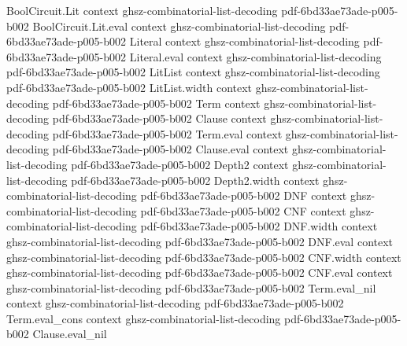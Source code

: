 \begin{lemma}
\label{BoolFourier.fourier_expansion}
\leanok
{}
\proofstep
  {BoolCircuit.Lit}
  {context}
  {ghsz-combinatorial-list-decoding}
  {pdf-6bd33ae73ade-p005-b002}
\proofstep
  {BoolCircuit.Lit.eval}
  {context}
  {ghsz-combinatorial-list-decoding}
  {pdf-6bd33ae73ade-p005-b002}
\proofstep
  {Literal}
  {context}
  {ghsz-combinatorial-list-decoding}
  {pdf-6bd33ae73ade-p005-b002}
\proofstep
  {Literal.eval}
  {context}
  {ghsz-combinatorial-list-decoding}
  {pdf-6bd33ae73ade-p005-b002}
\proofstep
  {LitList}
  {context}
  {ghsz-combinatorial-list-decoding}
  {pdf-6bd33ae73ade-p005-b002}
\proofstep
  {LitList.width}
  {context}
  {ghsz-combinatorial-list-decoding}
  {pdf-6bd33ae73ade-p005-b002}
\proofstep
  {Term}
  {context}
  {ghsz-combinatorial-list-decoding}
  {pdf-6bd33ae73ade-p005-b002}
\proofstep
  {Clause}
  {context}
  {ghsz-combinatorial-list-decoding}
  {pdf-6bd33ae73ade-p005-b002}
\proofstep
  {Term.eval}
  {context}
  {ghsz-combinatorial-list-decoding}
  {pdf-6bd33ae73ade-p005-b002}
\proofstep
  {Clause.eval}
  {context}
  {ghsz-combinatorial-list-decoding}
  {pdf-6bd33ae73ade-p005-b002}
\proofstep
  {Depth2}
  {context}
  {ghsz-combinatorial-list-decoding}
  {pdf-6bd33ae73ade-p005-b002}
\proofstep
  {Depth2.width}
  {context}
  {ghsz-combinatorial-list-decoding}
  {pdf-6bd33ae73ade-p005-b002}
\proofstep
  {DNF}
  {context}
  {ghsz-combinatorial-list-decoding}
  {pdf-6bd33ae73ade-p005-b002}
\proofstep
  {CNF}
  {context}
  {ghsz-combinatorial-list-decoding}
  {pdf-6bd33ae73ade-p005-b002}
\proofstep
  {DNF.width}
  {context}
  {ghsz-combinatorial-list-decoding}
  {pdf-6bd33ae73ade-p005-b002}
\proofstep
  {DNF.eval}
  {context}
  {ghsz-combinatorial-list-decoding}
  {pdf-6bd33ae73ade-p005-b002}
\proofstep
  {CNF.width}
  {context}
  {ghsz-combinatorial-list-decoding}
  {pdf-6bd33ae73ade-p005-b002}
\proofstep
  {CNF.eval}
  {context}
  {ghsz-combinatorial-list-decoding}
  {pdf-6bd33ae73ade-p005-b002}
\proofstep
  {Term.eval_nil}
  {context}
  {ghsz-combinatorial-list-decoding}
  {pdf-6bd33ae73ade-p005-b002}
\proofstep
  {Term.eval_cons}
  {context}
  {ghsz-combinatorial-list-decoding}
  {pdf-6bd33ae73ade-p005-b002}
\proofstep
  {Clause.eval_nil}

\end{lemma}
